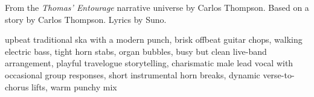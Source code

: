 
\begin{notes}
From the \emph{Thomas’ Entourage} narrative universe by Carlos Thompson. Based on a story by Carlos Thompson. Lyrics by Suno.
\end{notes}
\begin{style}
upbeat traditional ska with a modern punch, brisk offbeat guitar chops, walking electric bass, tight horn stabs, organ bubbles, busy but clean live-band arrangement, playful travelogue storytelling, charismatic male lead vocal with occasional group responses, short instrumental horn breaks, dynamic verse-to-chorus lifts, warm punchy mix
\end{style}
